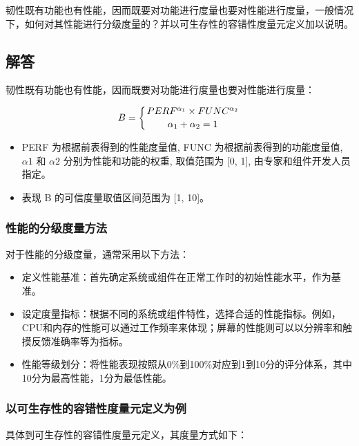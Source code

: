 \documentclass{article}
\begin{document}
韧性既有功能也有性能，因而既要对功能进行度量也要对性能进行度量，一般情况下，如何对其性能进行分级度量的？并以可生存性的容错性度量元定义加以说明。

\subsection{解答}

韧性既有功能也有性能，因而既要对功能进行度量也要对性能进行度量：

$$
B = \left\{ PERF^{\alpha_1} \times FUNC^{\alpha_2} \atop \alpha_1+\alpha_2 = 1 \right.
$$

\begin{itemize}
	\item PERF 为根据前表得到的性能度量值, FUNC 为根据前表得到的功能度量值, $\alpha1$ 和 $\alpha2$ 分别为性能和功能的权重, 取值范围为 [0, 1], 由专家和组件开发人员指定。
	\item 表现 B 的可信度量取值区间范围为 [1, 10]。
\end{itemize}

\subsubsection{性能的分级度量方法}

对于性能的分级度量，通常采用以下方法：

\begin{itemize}
	\item 定义性能基准：首先确定系统或组件在正常工作时的初始性能水平，作为基准。
	\item 设定度量指标：根据不同的系统或组件特性，选择合适的性能指标。例如，CPU和内存的性能可以通过工作频率来体现；屏幕的性能则可以以分辨率和触摸反馈准确率等为指标。
	\item 性能等级划分：将性能表现按照从0\%到100\%对应到1到10分的评分体系，其中10分为最高性能，1分为最低性能。
\end{itemize}

\subsubsection{以可生存性的容错性度量元定义为例}

具体到可生存性的容错性度量元定义，其度量方式如下：
\end{document}
